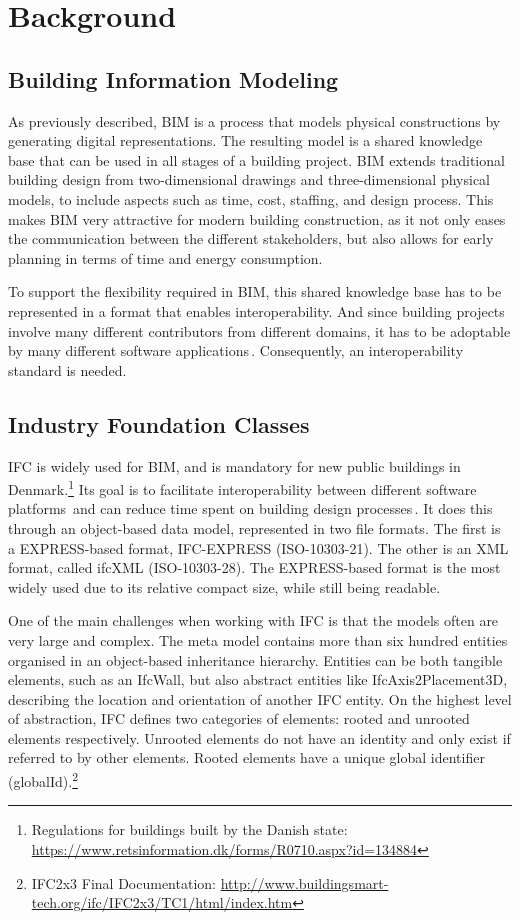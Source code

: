 \section{Background}
\label{sec:background}
\subsection{Building Information Modeling}
\label{sec:building_information_modeling}
As previously described, BIM is a process that models physical constructions by generating digital representations. The resulting model is a shared knowledge base that can be used in all stages of a building project. BIM extends traditional building design from two-dimensional drawings and three-dimensional physical models, to include aspects such as time, cost, staffing, and design process. This makes BIM very attractive for modern building construction, as it not only eases the communication between the different stakeholders, but also allows for early planning in terms of time and energy consumption.

To support the flexibility required in BIM, this shared knowledge base has to be represented in a format that enables interoperability. And since building projects involve many different contributors from different domains, it has to be adoptable by many different software applications\,\cite{quteprints37725}. Consequently, an interoperability standard is needed.

\subsection{Industry Foundation Classes}
\label{sec:industry_foundation_classes}
IFC is widely used for BIM, and is mandatory for new public buildings in Denmark.\footnote{Regulations for buildings built by the Danish state: \url{https://www.retsinformation.dk/forms/R0710.aspx?id=134884}} Its goal is to facilitate interoperability between different software platforms\,\cite{steel11} and can reduce time spent on building design processes\,\cite{bazjanac99}. It does this through an object-based data model, represented in two file formats. The first is a EXPRESS-based format, IFC-EXPRESS (ISO-10303-21). The other is an XML format, called ifcXML (ISO-10303-28). The EXPRESS-based format is the most widely used due to its relative compact size, while still being readable.

One of the main challenges when working with IFC is that the models often are very large and complex. The meta model contains more than six hundred entities organised in an object-based inheritance hierarchy. Entities can be both tangible elements, such as an IfcWall, but also abstract entities like IfcAxis2Placement3D, describing the location and orientation of another IFC entity. On the highest level of abstraction, IFC defines two categories of elements: rooted and unrooted elements respectively. Unrooted elements do not have an identity and only exist if referred to by other elements. Rooted elements have a unique global identifier (globalId).\footnote{IFC2x3 Final Documentation: \url{http://www.buildingsmart-tech.org/ifc/IFC2x3/TC1/html/index.htm}}

